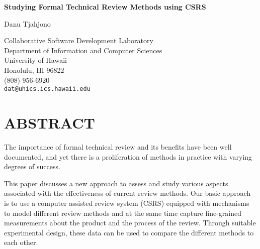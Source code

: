 




\vspace*{1in}

\begin{center}
  {\Large\bf Studying Formal Technical Review Methods using CSRS}\\ 
  \bigskip\par
  

  Danu Tjahjono                    \bigskip\par
  
  Collaborative Software Development Laboratory\\
  Department of Information and Computer Sciences\\
  University of Hawaii\\
  Honolulu, HI 96822\\
  (808) 956-6920\\
  {\tt dat@uhics.ics.hawaii.edu}           \bigskip\par
  
\end{center}

\bigskip
\section* {ABSTRACT}

The importance of formal technical review and its benefits have been
well documented, and yet there is a proliferation of methods in
practice with varying degrees of success.

This paper discusses a new approach to assess and study various
aspects associated with the effectiveness of current review methods.
Our basic approach is to use a computer assisted review system (CSRS)
equipped with mechanisms to model different review methods and 
at the same time capture fine-grained measurements
about the product and the process of the review.
Through suitable experimental design, these data can be used to
compare the different methods to each other.







